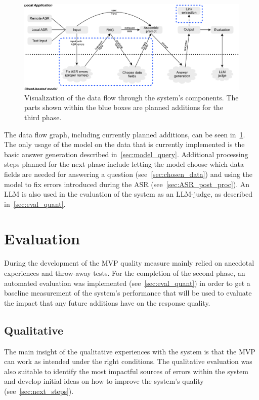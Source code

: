 \documentclass{article}
\begin{document}
\begin{figure}
    \centering
    \includegraphics[width=1\linewidth]{docs/data_flow.pdf}
    \caption{Visualization of the data flow through the system's components. The parts shown within the blue boxes are planned additions for the third phase.}
    \label{fig:data_flow}
\end{figure}

The data flow graph, including currently planned additions, can be seen in~\cref{fig:data_flow}. The only usage of the model on the data that is currently implemented is the basic answer generation described in~\cref{sec:model_query}. Additional processing steps planned for the next phase include letting the model choose which data fields are needed for answering a question (see~\cref{sec:chosen_data}) and using the model to fix errors introduced during the ASR (see~\cref{sec:ASR_post_proc}). An LLM is also used in the evaluation of the system as an LLM-judge, as described in~\cref{sec:eval_quant}.



\section{Evaluation}
During the development of the MVP quality measure mainly relied on anecdotal experiences and throw-away tests. For the completion of the second phase, an automated evaluation was implemented (see~\cref{sec:eval_quant}) in order to get a baseline measurement of the system's performance that will be used to evaluate the impact that any future additions have on the response quality.

\subsection{Qualitative} \label{sec:eval_qual}
The main insight of the qualitative experiences with the system is that the MVP can work as intended under the right conditions. The qualitative evaluation was also suitable to identify the most impactful sources of errors within the system and develop initial ideas on how to improve the system's quality (see~\cref{sec:next_steps}).\\
\end{document}
